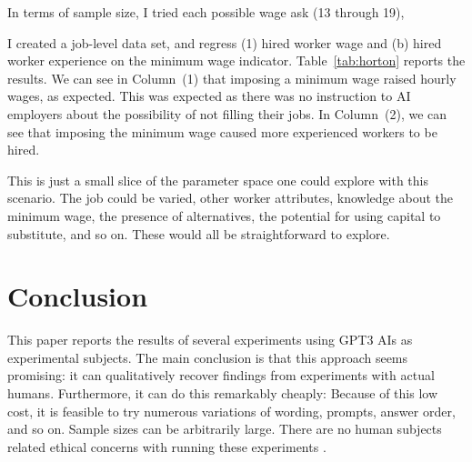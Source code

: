 \documentclass[11pt]{article}
\begin{document}
In terms of sample size, I tried each possible wage ask (13 through 19), 

I created a job-level data set, and regress (1) hired worker wage and (b) hired worker experience on the minimum wage indicator.
Table~\ref{tab:horton} reports the results.
We can see in Column~(1) that imposing a minimum wage raised hourly wages, as expected. 
This was expected as there was no instruction to AI employers about the possibility of not filling their jobs.
In Column~(2), we can see that imposing the minimum wage caused more experienced workers to be hired. 



This is just a small slice of the parameter space one could explore with this scenario.
The job could be varied, other worker attributes, knowledge about the minimum wage, the presence of alternatives, the potential for using capital to substitute, and so on. 
These would all be straightforward to explore.

\section{Conclusion} \label{sec:conclusion}
This paper reports the results of several experiments using GPT3 AIs as experimental subjects.
The main conclusion is that this approach seems promising: it can qualitatively recover findings from experiments with actual humans.
Furthermore, it can do this remarkably cheaply: 
Because of this low cost, it is feasible to try numerous variations of wording, prompts, answer order, and so on.
Sample sizes can be arbitrarily large. 
There are no human subjects related ethical concerns with running these experiments \citep{kessler2019}.

\end{document}
